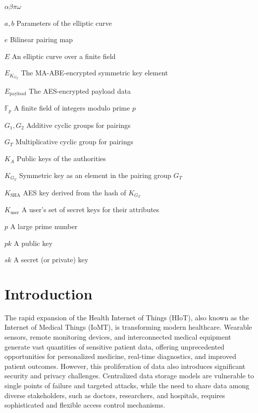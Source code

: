 \documentclass[cic,tc,english]{iiufrgs}
\numberwithin{algorithm}{chapter}
\begin{document}
\begin{listofsymbols}{$\alpha\beta\pi\omega$}
    \item[$a, b$] Parameters of the elliptic curve
    \item[$e$] Bilinear pairing map
    \item[$E$] An elliptic curve over a finite field
    \item[$E_{K_{G_T}}$] The MA-ABE-encrypted symmetric key element
    \item[$E_{\text{payload}}$] The AES-encrypted payload data
    \item[$\mathbb{F}_p$] A finite field of integers modulo prime $p$
    \item[$G_1, G_2$] Additive cyclic groups for pairings
    \item[$G_T$] Multiplicative cyclic group for pairings
    \item[$K_A$] Public keys of the authorities
    \item[$K_{G_T}$] Symmetric key as an element in the pairing group $G_T$
    \item[$K_{\text{SHA}}$] AES key derived from the hash of $K_{G_T}$
    \item[$K_{\text{user}}$] A user's set of secret keys for their attributes
    \item[$p$] A large prime number
    \item[$pk$] A public key
    \item[$sk$] A secret (or private) key
\end{listofsymbols}

\tableofcontents


\chapter{Introduction}
\label{chap:introduction}
    The rapid expansion of the Health Internet of Things (HIoT), also known as the Internet of Medical Things (IoMT), is transforming modern healthcare. Wearable sensors, remote monitoring devices, and interconnected medical equipment generate vast quantities of sensitive patient data, offering unprecedented opportunities for personalized medicine, real-time diagnostics, and improved patient outcomes. However, this proliferation of data also introduces significant security and privacy challenges. Centralized data storage models are vulnerable to single points of failure and targeted attacks, while the need to share data among diverse stakeholders, such as doctors, researchers, and hospitals, requires sophisticated and flexible access control mechanisms.
\end{document}

